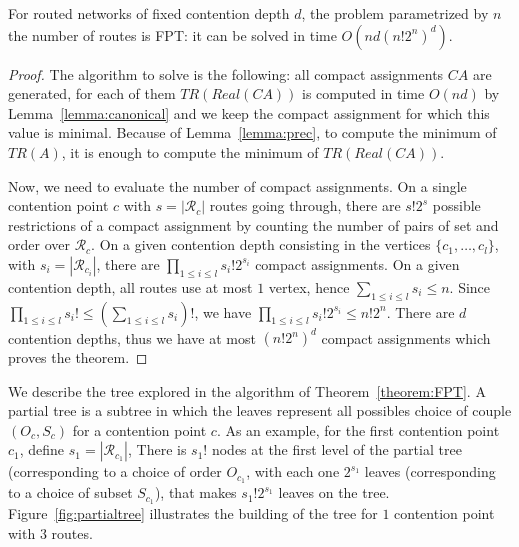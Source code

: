 \begin{theorem}\label{theorem:FPT}
For routed networks of fixed contention depth $d$, the problem \spall parametrized by $n$ the number of routes is FPT: it can be solved in time $O(nd(n!2^{n})^{d})$.
\end{theorem}
\begin{proof}
The algorithm to solve \spall is the following: all compact assignments $CA$ are generated, for each of them $TR(Real(CA))$ is computed in time $O(nd)$ by Lemma~\ref{lemma:canonical} and we keep the compact assignment for which this value is minimal.  Because of Lemma~\ref{lemma:prec}, to compute the minimum of $TR(A)$, it is enough 
to compute the minimum of $TR(Real(CA))$.

 Now, we need to evaluate the number of compact assignments. 
On a single contention point $c$ with $s = |\mathcal{R}_c|$ routes going through, there are $s!2^s$ possible restrictions of a compact assignment by counting the number of pairs of set and order over $\mathcal{R}_c$.
On a given contention depth consisting in the vertices $\{c_1,\dots,c_l\}$, with $s_i = |\mathcal{R}_{c_{i}}|$, there are 
$\prod_{1 \leq i\leq l} s_i!2^{s_i}$ compact assignments. On a given contention depth, all routes use at most $1$ vertex, hence $\sum_{1 \leq i\leq l} s_i \leq n$. Since $\prod_{1 \leq i\leq l} s_i! \leq (\sum_{1 \leq i\leq l} s_i)!$, we have $\prod_{1 \leq i\leq l} s_i!2^{s_i} \leq n!2^n$. There are $d$ contention depths, thus we have at most $ (n!2^{n})^{d}$ compact assignments which proves the theorem.
\end{proof}

We describe the tree explored in the algorithm of Theorem~\ref{theorem:FPT}. A partial tree is a subtree in which the leaves represent all possibles choice of couple $(O_{c},S_c)$ for a contention point $c$. As an example, for the first contention point $c_1$, define $s_1 = |\mathcal{R}_{c_1}|$, There is $s_1!$ nodes at the first level of the partial tree (corresponding to a choice of order $O_{c_1}$, with each one $2^{s_1}$ leaves (corresponding to a choice of subset $S_{c_1}$), that makes $s_1!2^{s_1}$ leaves on the tree. Figure~\ref{fig:partialtree} illustrates the building of the tree for $1$ contention point with $3$ routes.

